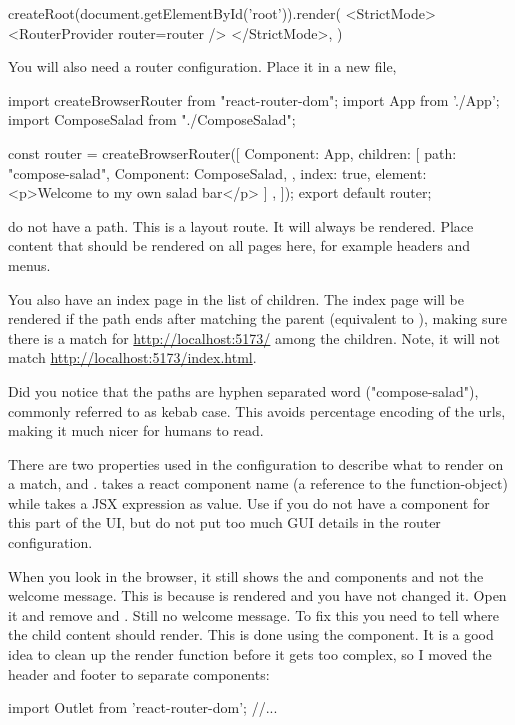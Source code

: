 \documentclass[fleqn, article, a4paper]{memoir}
\begin{document}
\begin{Assignments}
\begin{Code}
createRoot(document.getElementById('root')).render(
  <StrictMode>
    <RouterProvider router={router} />
  </StrictMode>,
)
\end{Code}
\noindent You will also need a router configuration. Place it in a new file, 
\begin{Code}
import { createBrowserRouter } from "react-router-dom";
import App from './App';
import ComposeSalad from "./ComposeSalad";

const router = createBrowserRouter([
  {
    Component: App,
    children: [
      {
        path: "compose-salad",
        Component: ComposeSalad,
      }, {
        index: true,
        element: <p>Welcome to my own salad bar</p>
      }]
  },
]);
export default router;
\end{Code}
\noindent {} do not have a path. This is a layout route. It will always be rendered. Place content that should be rendered on all pages here, for example headers and menus.

You also have an index page in the list of children. The index page will be rendered if the path ends after matching the parent (equivalent to ), making sure there is a match for \url{http://localhost:5173/} among the children. Note, it will not match \url{http://localhost:5173/index.html}.

Did you notice that the paths are hyphen separated word ("compose-salad"), commonly referred to as kebab case. This avoids percentage encoding of the urls, making it much nicer for humans to read.

There are two properties used in the configuration to describe what to render on a match,  and .  takes a react component name (a reference to the function-object) while  takes a JSX expression as value. Use  if you do not have a component for this part of the UI, but do not put too much GUI details in the router configuration.

When you look in the browser, it still shows the  and  components and not the welcome message. This is because  is rendered and you have not changed it. Open it and remove  and . Still no welcome message. To fix this you need to tell where the child content should render. This is done using the  component. It is a good idea to clean up the render function before it gets too complex, so I moved the header and footer to separate components:
\begin{Code}
import { Outlet } from 'react-router-dom';
//...


\end{Code}
\end{Assignments}
\end{document}
